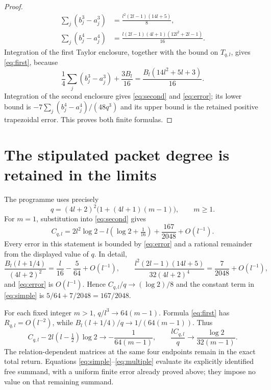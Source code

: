 \documentclass[11pt,a4paper]{article}
\begin{document}
\begin{proof}
\begin{align*}
 \sum_j(b_j^3-a_j^3)&=\frac{l^2(2l-1)(14l+5)}8,\\
 \sum_j(b_j^4-a_j^4)&=
       \frac{l(2l-1)(4l+1)(12l^2+2l-1)}{16}.
\end{align*}
Integration of the first Taylor enclosure, together with the bound on
$T_{q,l}$, gives \eqref{eq:first}, because
\[
 \frac14\sum_j(b_j^3-a_j^3)+\frac{3B_l}{16}
 =\frac{B_l(14l^2+5l+3)}{16}.
\]
Integration of the second enclosure gives \eqref{eq:second} and
\eqref{eq:error}; its lower bound is
$-7\sum_j(b_j^4-a_j^4)/(48q^3)$ and its upper bound is the retained
positive trapezoidal error. This proves both finite formulas.
\end{proof}

\section{The stipulated packet degree is retained in the limits}
The programme uses precisely
\[
 q=(4l+2)^2\bigl(1+(4l+1)(m-1)\bigr),\qquad m\ge1.
\]
For $m=1$, substitution into \eqref{eq:second} gives
\begin{equation}\label{eq:simple}
 C_{q,l}=2l^2\log2-l(\log2+\tfrac1{16})
                 +\frac{167}{2048}+O(l^{-1}).
\end{equation}
Every error in this statement is bounded by \eqref{eq:error} and a
rational remainder from the displayed value of $q$. In detail,
\[
 \frac{B_l(l+1/4)}{(4l+2)^2}
 =\frac l{16}-\frac5{64}+O(l^{-1}),\qquad
 \frac{l^2(2l-1)(14l+5)}{32(4l+2)^4}
 =\frac7{2048}+O(l^{-1}),
\]
and \eqref{eq:error} is $O(l^{-1})$. Hence $C_{q,l}/q\to(\log2)/8$
and the constant term in \eqref{eq:simple} is $5/64+7/2048=167/2048$.

For each fixed integer $m>1$, $q/l^3\to64(m-1)$. Formula
\eqref{eq:first} has $R_{q,l}=O(l^{-2})$, while
$B_l(l+1/4)/q\to1/(64(m-1))$. Thus
\begin{equation}\label{eq:multiple}
 C_{q,l}-2l(l-\tfrac12)\log2\longrightarrow-\frac1{64(m-1)},
 \qquad
 \frac{lC_{q,l}}q\longrightarrow\frac{\log2}{32(m-1)}.
\end{equation}
The relation-dependent matrices at the same four endpoints remain in
the exact total return. Equations \eqref{eq:simple}--\eqref{eq:multiple}
evaluate its explicitly identified free summand, with a uniform finite
error already proved above; they impose no value on that remaining
summand.
\end{document}
